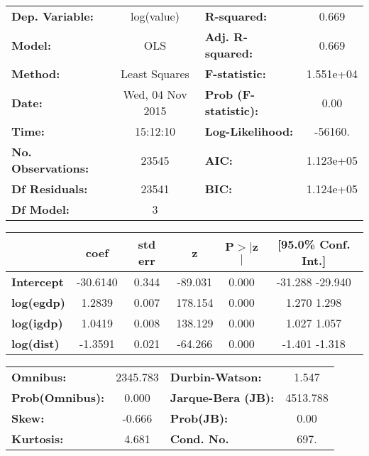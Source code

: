 \begin{center}
\begin{tabular}{lclc}
\toprule
\textbf{Dep. Variable:}    &    log(value)    & \textbf{  R-squared:         } &     0.669   \\
\textbf{Model:}            &       OLS        & \textbf{  Adj. R-squared:    } &     0.669   \\
\textbf{Method:}           &  Least Squares   & \textbf{  F-statistic:       } & 1.551e+04   \\
\textbf{Date:}             & Wed, 04 Nov 2015 & \textbf{  Prob (F-statistic):} &     0.00    \\
\textbf{Time:}             &     15:12:10     & \textbf{  Log-Likelihood:    } &   -56160.   \\
\textbf{No. Observations:} &       23545      & \textbf{  AIC:               } & 1.123e+05   \\
\textbf{Df Residuals:}     &       23541      & \textbf{  BIC:               } & 1.124e+05   \\
\textbf{Df Model:}         &           3      & \textbf{                     } &             \\
\bottomrule
\end{tabular}
\begin{tabular}{lccccc}
                   & \textbf{coef} & \textbf{std err} & \textbf{z} & \textbf{P$>$$|$z$|$} & \textbf{[95.0\% Conf. Int.]}  \\
\midrule
\textbf{Intercept} &     -30.6140  &        0.344     &   -89.031  &         0.000        &       -31.288   -29.940       \\
\textbf{log(egdp)} &       1.2839  &        0.007     &   178.154  &         0.000        &         1.270     1.298       \\
\textbf{log(igdp)} &       1.0419  &        0.008     &   138.129  &         0.000        &         1.027     1.057       \\
\textbf{log(dist)} &      -1.3591  &        0.021     &   -64.266  &         0.000        &        -1.401    -1.318       \\
\bottomrule
\end{tabular}
\begin{tabular}{lclc}
\textbf{Omnibus:}       & 2345.783 & \textbf{  Durbin-Watson:     } &    1.547  \\
\textbf{Prob(Omnibus):} &   0.000  & \textbf{  Jarque-Bera (JB):  } & 4513.788  \\
\textbf{Skew:}          &  -0.666  & \textbf{  Prob(JB):          } &     0.00  \\
\textbf{Kurtosis:}      &   4.681  & \textbf{  Cond. No.          } &     697.  \\
\bottomrule
\end{tabular}
\end{center}